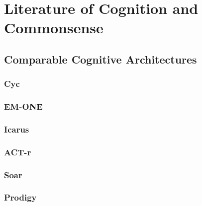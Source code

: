\chapter{Literature of Cognition and Commonsense}\label{ch:literature_of_cognition_and_commonsense}

\section{Comparable Cognitive Architectures}

\subsection{Cyc}
\subsection{EM-ONE}
\subsection{Icarus}
\subsection{ACT-r}
\subsection{Soar}
\subsection{Prodigy}

